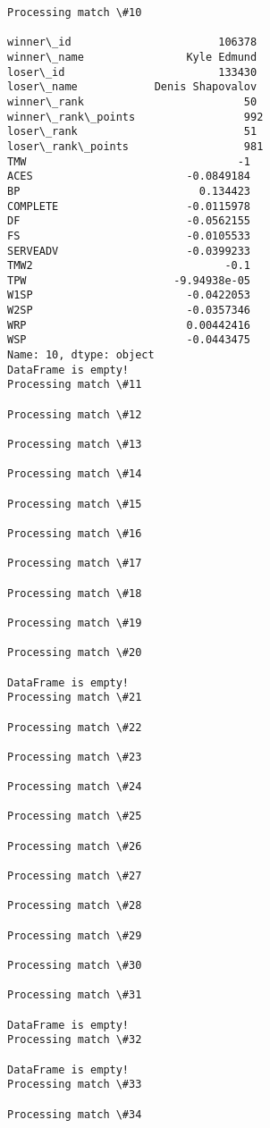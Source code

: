 \documentclass[11pt]{article}
\begin{document}
    \begin{Verbatim}[commandchars=\\\{\}]
Processing match \#10

winner\_id                       106378
winner\_name                Kyle Edmund
loser\_id                        133430
loser\_name            Denis Shapovalov
winner\_rank                         50
winner\_rank\_points                 992
loser\_rank                          51
loser\_rank\_points                  981
TMW                                 -1
ACES                        -0.0849184
BP                            0.134423
COMPLETE                    -0.0115978
DF                          -0.0562155
FS                          -0.0105533
SERVEADV                    -0.0399233
TMW2                              -0.1
TPW                       -9.94938e-05
W1SP                        -0.0422053
W2SP                        -0.0357346
WRP                         0.00442416
WSP                         -0.0443475
Name: 10, dtype: object
DataFrame is empty!
Processing match \#11

Processing match \#12

Processing match \#13

Processing match \#14

Processing match \#15

Processing match \#16

Processing match \#17

Processing match \#18

Processing match \#19

Processing match \#20

DataFrame is empty!
Processing match \#21

Processing match \#22

Processing match \#23

Processing match \#24

Processing match \#25

Processing match \#26

Processing match \#27

Processing match \#28

Processing match \#29

Processing match \#30

Processing match \#31

DataFrame is empty!
Processing match \#32

DataFrame is empty!
Processing match \#33

Processing match \#34


\end{Verbatim}
\end{document}
